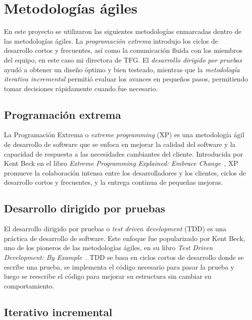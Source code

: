 \section{Metodologías ágiles}

En este proyecto se utilizaron las siguientes metodologías enmarcadas dentro de las metodologías ágiles.
La \textit{programación extrema} introdujo los ciclos de desarrollo cortos y frecuentes, así como la comunicación
fluida con los miembros del equipo, en este caso mi directora de TFG.
El \textit{desarrollo dirigido por pruebas} ayudó a obtener un diseño óptimo y bien testeado, mientras que la
\textit{metodología iterativa incremental} permitió evaluar los avances en pequeños pasos, permitiendo tomar
decisiones rápidamente cuando fue necesario.

\subsection{Programación extrema}

La Programación Extrema o \textit{extreme programming} (XP) es una metodología ágil de desarrollo de software que se
enfoca en mejorar la calidad del software y la capacidad de respuesta a las necesidades cambiantes del cliente.
Introducida por Kent Beck en el libro \textit{Extreme Programming Explained: Embrace Change}~\cite{book_beck_1999},
XP promueve la colaboración intensa entre los desarrolladores y los clientes, ciclos de desarrollo cortos y frecuentes,
y la entrega continua de pequeñas mejoras.

\subsection{Desarrollo dirigido por pruebas}

El desarrollo dirigido por pruebas o \textit{test driven development} (TDD) es una práctica de desarrollo de software.
Este enfoque fue popularizado por Kent Beck, uno de los pioneros de las metodologías ágiles, en su libro
\textit{Test Driven Development: By Example}~\cite{book_beck_2003}.
TDD se basa en ciclos cortos de desarrollo donde se escribe una prueba, se implementa el código necesario para pasar la
prueba y luego se reescribe el código para mejorar su estructura sin cambiar su comportamiento.

\subsection{Iterativo incremental}\label{subsec:iterativo_incremental}


